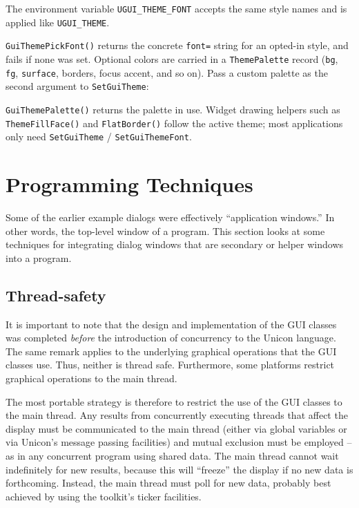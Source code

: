 
\noindent
The environment variable \texttt{UGUI\_THEME\_FONT} accepts the same
style names and is applied like \texttt{UGUI\_THEME}.

\noindent
\texttt{GuiThemePickFont()} returns the concrete \texttt{font=}
string for an opted-in style, and fails if none was set. Optional
colors are carried in a
\texttt{ThemePalette} record (\texttt{bg}, \texttt{fg},
\texttt{surface}, borders, focus accent, and so on). Pass a custom
palette as the second argument to \texttt{SetGuiTheme}:


\noindent
\texttt{GuiThemePalette()} returns the palette in use.
Widget drawing helpers such as \texttt{ThemeFillFace()} and
\texttt{FlatBorder()} follow the active theme; most applications only
need \texttt{SetGuiTheme} / \texttt{SetGuiThemeFont}.

\section{Programming Techniques}

Some of the earlier example dialogs were effectively
``application windows.'' In other words, the
top-level window of a program. This section looks at some techniques
for integrating dialog windows that are secondary or helper windows
into a program.

\subsection*{Thread-safety}
It is important to note that the design and implementation of the GUI classes was
completed {\em before }the introduction of concurrency to the Unicon language.
The same remark applies to the underlying graphical operations that the GUI classes
use. Thus, neither is thread safe. Furthermore, some platforms restrict graphical
operations to the main thread.

The most portable strategy is therefore to restrict the use of the GUI classes to the main
thread. Any results from concurrently executing threads that affect the display must be
communicated to the main thread (either via global variables or via Unicon's message
passing facilities) and mutual exclusion must be employed -- as in any concurrent program
using shared data. The main thread cannot wait indefinitely for new results, because this
will ``freeze'' the display if no new data is forthcoming. Instead, the main thread must
poll for new data, probably best achieved by using the toolkit's ticker facilities.

